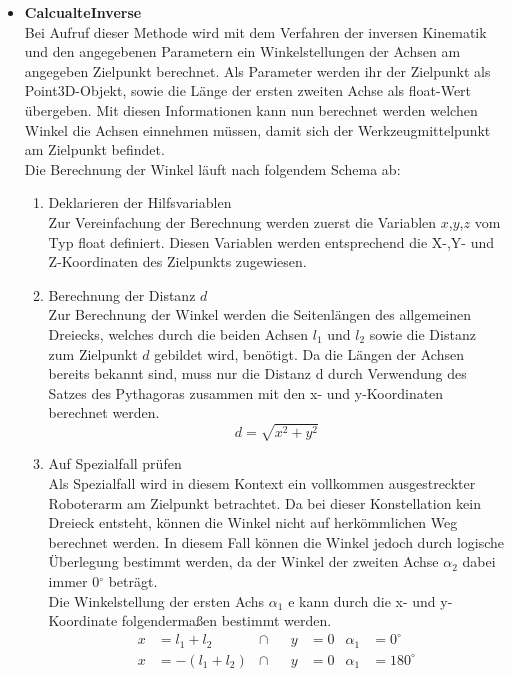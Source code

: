 \begin{itemize}
\begin{enumerate}
\begin{itemize}
\end{itemize}
\end{enumerate}
\newpage
\item \textbf{CalcualteInverse}\\
Bei Aufruf dieser Methode wird mit dem Verfahren der inversen Kinematik und den angegebenen Parametern ein Winkelstellungen der Achsen am angegeben Zielpunkt berechnet. Als Parameter werden ihr der Zielpunkt als Point3D-Objekt, sowie die Länge der ersten zweiten Achse als float-Wert übergeben. Mit diesen Informationen kann nun berechnet werden welchen Winkel die Achsen einnehmen müssen, damit  sich der Werkzeugmittelpunkt am Zielpunkt befindet.\\
Die Berechnung der Winkel läuft nach folgendem Schema ab:
\begin{enumerate}
\item Deklarieren der Hilfsvariablen\\
Zur Vereinfachung der Berechnung werden zuerst die Variablen $x$,$y$,$z$ vom Typ float definiert. Diesen Variablen werden entsprechend die X-,Y- und Z-Koordinaten des Zielpunkts zugewiesen.
\item Berechnung der Distanz $d$\\
Zur Berechnung der Winkel werden die Seitenlängen des allgemeinen Dreiecks, welches durch die beiden Achsen $l_1$ und $l_2$ sowie die Distanz zum Zielpunkt $d$ gebildet wird, benötigt. Da die Längen der Achsen bereits bekannt sind, muss nur die Distanz d durch Verwendung des Satzes des Pythagoras zusammen mit den x- und y-Koordinaten berechnet werden.\\
\begin{equation*}
d = \sqrt{x^2 + y^2}
\end{equation*}
\item Auf Spezialfall prüfen\\
Als Spezialfall wird in diesem Kontext ein vollkommen ausgestreckter Roboterarm am Zielpunkt betrachtet. Da bei dieser Konstellation kein Dreieck entsteht, können die Winkel nicht auf herkömmlichen Weg berechnet werden. In diesem Fall können die Winkel jedoch durch logische Überlegung bestimmt werden, da der Winkel der zweiten Achse $\alpha_2$ dabei immer 0$^\circ$ beträgt.\\
Die Winkelstellung der ersten Achs $\alpha_1$ e kann durch die x- und y-Koordinate folgendermaßen bestimmt werden.
\begin{align*}
x & = l_1+l_2 &\cap && y & = 0 & \alpha_1 & = 0^\circ \\
x & = -(l_1+l_2) &\cap && y & = 0 & \alpha_1 & = 180^\circ \\ 

\end{align*}
\end{enumerate}
\end{itemize}
